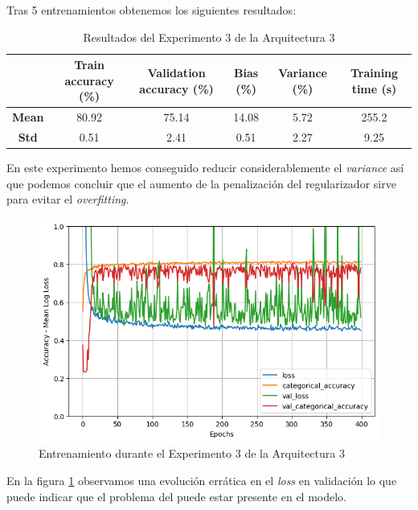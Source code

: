 \documentclass{article}
\begin{document}
			Tras 5 entrenamientos obtenemos los siguientes resultados:
			\begin{table}[!h]
				\begin{center}
					\begin{tabular}{ c | c | c | c | c | c |}
						\ & \textbf{Train accuracy (\%)} & \textbf{Validation accuracy (\%)} & \textbf{Bias (\%)} & \textbf{Variance (\%)} & \textbf{Training time (s)} \\ \hline
						\textbf{Mean} & 80.92 & 75.14 & 14.08 & 5.72 & 255.2 \\ \hline
						\textbf{Std} & 0.51 & 2.41 & 0.51 & 2.27 & 9.25 \\ \hline
					\end{tabular}
					\caption{Resultados del Experimento 3 de la Arquitectura 3}
					\label{tab:res-a3-e3}
				\end{center}
			\end{table}
			
			En este experimento hemos conseguido reducir considerablemente el \textit{variance} as\'i que podemos concluir que el aumento de la penalizaci\'on del regularizador sirve para evitar el \textit{overfitting}.
			\begin{figure}[!h]
				\begin{center}
					\includegraphics[scale=0.5]{tr-a3-e3.png}		
					\caption{Entrenamiento durante el Experimento 3 de la Arquitectura 3}	
					\label{tr-a3-e3}
				\end{center}
			\end{figure}
			En la figura \ref{tr-a3-e3} observamos una evoluci\'on err\'atica en el \textit{loss} en validaci\'on lo que puede indicar que el problema del  puede estar presente en el modelo.
			
\end{document}
